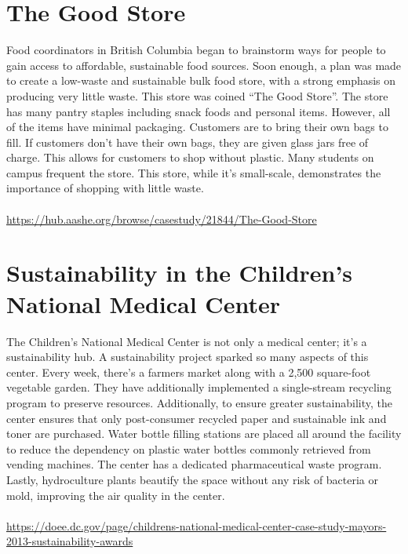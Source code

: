 \documentclass{article}
\begin{document}
\begin{spacing}{2.15}
    \section{The Good Store}
    \indent Food coordinators in British Columbia began to brainstorm ways for people to gain access to affordable, sustainable food sources. Soon enough, a plan was made to create a low-waste and sustainable bulk food store, with a strong emphasis on producing very little waste. This store was coined ``The Good Store''. The store has many pantry staples including snack foods and personal items. However, all of the items have minimal packaging. Customers are to bring their own bags to fill. If customers don't have their own bags, they are given glass jars free of charge. This allows for customers to shop without plastic. Many students on campus frequent the store. This store, while it's small-scale, demonstrates the importance of shopping with little waste. \\\\
    \url{https://hub.aashe.org/browse/casestudy/21844/The-Good-Store}
    \newpage
    \section{Sustainability in the Children's National Medical Center}
    \indent The Children's National Medical Center is not only a medical center; it's a sustainability hub. A sustainability project sparked so many aspects of this center. Every week, there's a farmers market along with a 2,500 square-foot vegetable garden. They have additionally implemented a single-stream recycling program to preserve resources. Additionally, to ensure greater sustainability, the center ensures that only post-consumer recycled paper and sustainable ink and toner are purchased. Water bottle filling stations are placed all around the facility to reduce the dependency on plastic water bottles commonly retrieved from vending machines. The center has a dedicated pharmaceutical waste program. Lastly, hydroculture plants beautify the space without any risk of bacteria or mold, improving the air quality in the center. \\\\
    \url{https://doee.dc.gov/page/childrens-national-medical-center-case-study-mayors-2013-sustainability-awards}

\end{spacing}
\end{document}
